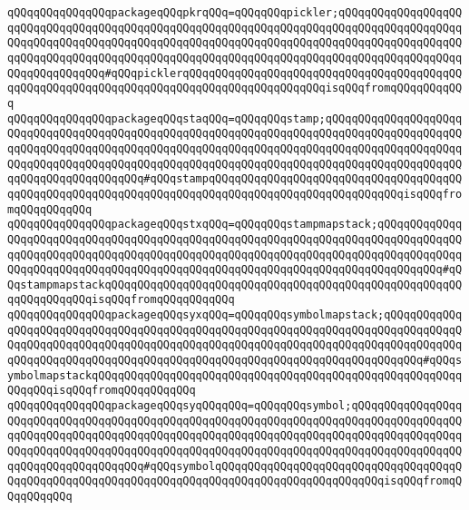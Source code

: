 \verb|qQQqqQQqqQQqqQQqpackageqQQqpkrqQQq=qQQqqQQqpickler;qQQqqQQqqQQqqQQqqQQqqQQqqQQqqQQqqQQqqQQqqQQqqQQqqQQqqQQqqQQqqQQqqQQqqQQqqQQqqQQqqQQqqQQqqQQqqQQqqQQqqQQqqQQqqQQqqQQqqQQqqQQqqQQqqQQqqQQqqQQqqQQqqQQqqQQqqQQqqQQqqQQqqQQqqQQqqQQqqQQqqQQqqQQqqQQqqQQqqQQqqQQqqQQqqQQqqQQqqQQqqQQqqQQqqQQqqQQqqQQqqQQq#qQQqpicklerqQQqqQQqqQQqqQQqqQQqqQQqqQQqqQQqqQQqqQQqqQQqqQQqqQQqqQQqqQQqqQQqqQQqqQQqqQQqqQQqqQQqqQQqqQQqisqQQqfromqQQqqQQqqQQq|\newline
\verb|qQQqqQQqqQQqqQQqpackageqQQqstaqQQq=qQQqqQQqstamp;qQQqqQQqqQQqqQQqqQQqqQQqqQQqqQQqqQQqqQQqqQQqqQQqqQQqqQQqqQQqqQQqqQQqqQQqqQQqqQQqqQQqqQQqqQQqqQQqqQQqqQQqqQQqqQQqqQQqqQQqqQQqqQQqqQQqqQQqqQQqqQQqqQQqqQQqqQQqqQQqqQQqqQQqqQQqqQQqqQQqqQQqqQQqqQQqqQQqqQQqqQQqqQQqqQQqqQQqqQQqqQQqqQQqqQQqqQQqqQQqqQQqqQQqqQQq#qQQqstampqQQqqQQqqQQqqQQqqQQqqQQqqQQqqQQqqQQqqQQqqQQqqQQqqQQqqQQqqQQqqQQqqQQqqQQqqQQqqQQqqQQqqQQqqQQqqQQqqQQqisqQQqfromqQQqqQQqqQQq|\newline
\verb|qQQqqQQqqQQqqQQqpackageqQQqstxqQQq=qQQqqQQqstampmapstack;qQQqqQQqqQQqqQQqqQQqqQQqqQQqqQQqqQQqqQQqqQQqqQQqqQQqqQQqqQQqqQQqqQQqqQQqqQQqqQQqqQQqqQQqqQQqqQQqqQQqqQQqqQQqqQQqqQQqqQQqqQQqqQQqqQQqqQQqqQQqqQQqqQQqqQQqqQQqqQQqqQQqqQQqqQQqqQQqqQQqqQQqqQQqqQQqqQQqqQQqqQQqqQQqqQQqqQQqqQQq#qQQqstampmapstackqQQqqQQqqQQqqQQqqQQqqQQqqQQqqQQqqQQqqQQqqQQqqQQqqQQqqQQqqQQqqQQqqQQqisqQQqfromqQQqqQQqqQQq|\newline
\verb|qQQqqQQqqQQqqQQqpackageqQQqsyxqQQq=qQQqqQQqsymbolmapstack;qQQqqQQqqQQqqQQqqQQqqQQqqQQqqQQqqQQqqQQqqQQqqQQqqQQqqQQqqQQqqQQqqQQqqQQqqQQqqQQqqQQqqQQqqQQqqQQqqQQqqQQqqQQqqQQqqQQqqQQqqQQqqQQqqQQqqQQqqQQqqQQqqQQqqQQqqQQqqQQqqQQqqQQqqQQqqQQqqQQqqQQqqQQqqQQqqQQqqQQqqQQqqQQqqQQqqQQq#qQQqsymbolmapstackqQQqqQQqqQQqqQQqqQQqqQQqqQQqqQQqqQQqqQQqqQQqqQQqqQQqqQQqqQQqqQQqisqQQqfromqQQqqQQqqQQq|\newline
\verb|qQQqqQQqqQQqqQQqpackageqQQqsyqQQqqQQq=qQQqqQQqsymbol;qQQqqQQqqQQqqQQqqQQqqQQqqQQqqQQqqQQqqQQqqQQqqQQqqQQqqQQqqQQqqQQqqQQqqQQqqQQqqQQqqQQqqQQqqQQqqQQqqQQqqQQqqQQqqQQqqQQqqQQqqQQqqQQqqQQqqQQqqQQqqQQqqQQqqQQqqQQqqQQqqQQqqQQqqQQqqQQqqQQqqQQqqQQqqQQqqQQqqQQqqQQqqQQqqQQqqQQqqQQqqQQqqQQqqQQqqQQqqQQqqQQqqQQq#qQQqsymbolqQQqqQQqqQQqqQQqqQQqqQQqqQQqqQQqqQQqqQQqqQQqqQQqqQQqqQQqqQQqqQQqqQQqqQQqqQQqqQQqqQQqqQQqqQQqqQQqisqQQqfromqQQqqQQqqQQq|\newline
